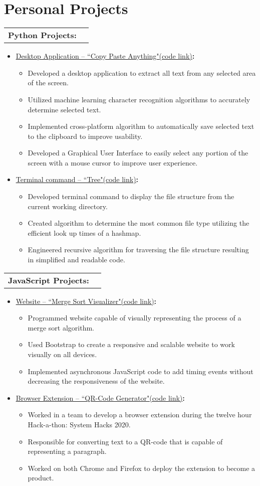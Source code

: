 \documentclass[letterpaper, 11pt]{article}
\makeatletter
\newcommand{\project}[2]{
  \item\small{
    \href{#2}{\underline{#1}\hspace{3pt}(code link)}\textbf{:} \vspace{-5pt}
  }
  \begin{itemize}
}
\newcommand{\resumeSubheading}[1]{
  \vspace{-1pt}
    \begin{tabular*}{0.97\textwidth}[t]{l@{\extracolsep{\fill}}r}
      \textbf{#1} \\
    \end{tabular*}\vspace{-5pt}
}
\newcommand{\projectEnd}{\end{itemize}}
\newcommand{\resumeItemListStart}{\begin{itemize}}
\newcommand{\resumeItemListEnd}{\end{itemize}}
\makeatother
\begin{document}
\section{Personal Projects}
    \resumeSubheading
      {Python Projects:}
      \resumeItemListStart
        \project{Desktop Application -- “Copy Paste Anything"} {https://github.com/Alex0Blackwell/copy-paste-anything}
          \item{Developed a desktop application to extract all text from any selected area of the screen.}
          \item{Utilized machine learning character recognition algorithms to accurately determine selected
          text.}
          \item{Implemented cross-platform algorithm to automatically save selected text to the clipboard to improve usability.}
          \item{Developed a Graphical User Interface to easily select any portion of the screen with a mouse cursor to improve user experience.}
        \projectEnd
        \project{Terminal command -- “Tree"} {https://github.com/Alex0Blackwell/tree}
          \item{Developed terminal command to display the file structure from the current working directory.}
          \item{Created algorithm to determine the most common file type utilizing the efficient look up times of a hashmap.}
          \item{Engineered recursive algorithm for traversing the file structure resulting in simplified and readable code.}
        \projectEnd
      \resumeItemListEnd
      \vspace{10pt}

    \resumeSubheading
      {JavaScript Projects:}
      \resumeItemListStart
        \project{Website -- “Merge Sort Visualizer"} {https://github.com/Alex0Blackwell/merge-sort-visualizer}
          \item{Programmed website capable of visually representing the process of a merge sort algorithm.}
          \item{Used Bootstrap to create a responsive and scalable website to work visually on all devices.}
          \item{Implemented asynchronous JavaScript code to add timing events without decreasing the responsiveness of the website.}
        \projectEnd
        \project{Browser Extension -- “QR-Code Generator"} {https://github.com/Alex0Blackwell/qr-code-extension}
          \item{Worked in a team to develop a browser extension during the twelve hour Hack-a-thon: System Hacks 2020.}
          \item{Responsible for converting text to a QR-code that is capable of representing a paragraph.}
          \item{Worked on both Chrome and Firefox to deploy the extension to become a product.}
        \projectEnd
      \resumeItemListEnd
      \vspace{10pt}
\end{document}
